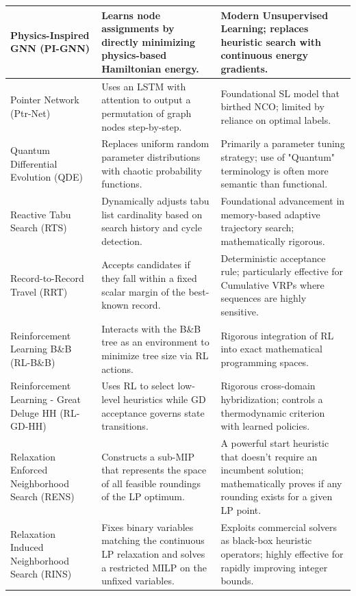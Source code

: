 \begin{center}
\begin{longtable}{
  >{\raggedright\arraybackslash}p{}
  >{\raggedright\arraybackslash}p{}
  >{\raggedright\arraybackslash}p{}
}
Physics-Inspired GNN (PI-GNN) & Learns node assignments by directly minimizing physics-based Hamiltonian energy. & Modern Unsupervised Learning; replaces heuristic search with continuous energy gradients. \\ \midrule

Pointer Network (Ptr-Net) & Uses an LSTM with attention to output a permutation of graph nodes step-by-step. & Foundational SL model that birthed NCO; limited by reliance on optimal labels. \\ \midrule

Quantum Differential Evolution (QDE) & Replaces uniform random parameter distributions with chaotic probability functions. & Primarily a parameter tuning strategy; use of "Quantum" terminology is often more semantic than functional. \\ \midrule

Reactive Tabu Search (RTS) & Dynamically adjusts tabu list cardinality based on search history and cycle detection. & Foundational advancement in memory-based adaptive trajectory search; mathematically rigorous. \\ \midrule

Record-to-Record Travel (RRT) & Accepts candidates if they fall within a fixed scalar margin of the best-known record. & Deterministic acceptance rule; particularly effective for Cumulative VRPs where sequences are highly sensitive. \\ \midrule

Reinforcement Learning B\&B (RL-B\&B) & Interacts with the B\&B tree as an environment to minimize tree size via RL actions. & Rigorous integration of RL into exact mathematical programming spaces. \\ \midrule

Reinforcement Learning - Great Deluge HH (RL-GD-HH) & Uses RL to select low-level heuristics while GD acceptance governs state transitions. & Rigorous cross-domain hybridization; controls a thermodynamic criterion with learned policies. \\ \midrule

Relaxation Enforced Neighborhood Search (RENS) & Constructs a sub-MIP that represents the space of all feasible roundings of the LP optimum. & A powerful start heuristic that doesn't require an incumbent solution; mathematically proves if any rounding exists for a given LP point. \\ \midrule

Relaxation Induced Neighborhood Search (RINS) & Fixes binary variables matching the continuous LP relaxation and solves a restricted MILP on the unfixed variables. & Exploits commercial solvers as black-box heuristic operators; highly effective for rapidly improving integer bounds. \\ \midrule


\end{longtable}
\end{center}
